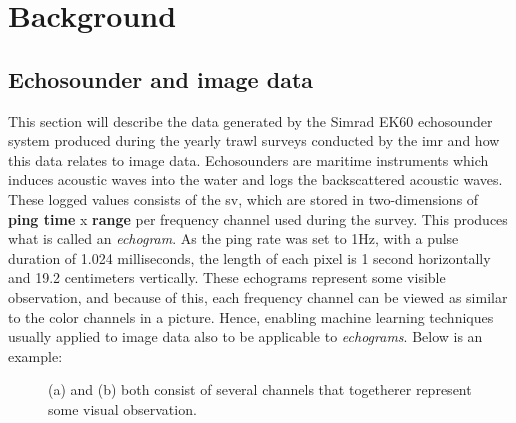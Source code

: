 \chapter{Background}
\section{Echosounder and image data}
    This section will describe the data generated by the Simrad EK60 echosounder system produced during the yearly trawl surveys conducted by the \gls{imr}\cite{johnsen2017collective} and how this data relates to image data. Echosounders are maritime instruments which induces acoustic waves into the water and logs the backscattered acoustic waves\cite{brautaset2020acoustic}. These logged values consists of the \gls{sv}, which are stored in two-dimensions of \textbf{ping time} x \textbf{range} per frequency channel used during the survey. This produces what is called an \textit{echogram}. As the ping rate was set to 1Hz\cite{choi2021semi}, with a pulse duration of 1.024 milliseconds, the length of each pixel is 1 second horizontally and 19.2 centimeters vertically. These echograms represent some visible observation, and because of this, each frequency channel can be viewed as similar to the color channels in a picture. Hence, enabling machine learning techniques usually applied to image data also to be applicable to \textit{echograms}. Below is an example:

    \begin{figure}[H]
        \centering
        
        
        
        
        \caption[Frequency channels and color channels]{(a) and (b) both consist of several channels that togetherer represent some visual observation.}
        \label{accoustic data and color channels fig}
        
        \end{figure}
    
    
    
